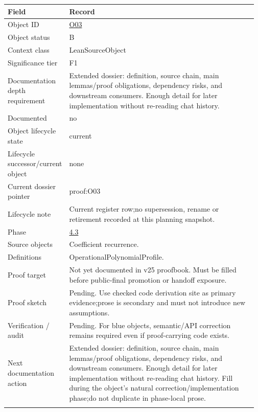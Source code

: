 \begin{longtable}{L{0.16\linewidth} L{0.81\linewidth}}
\hline
\textbf{Field} & \textbf{Record}\\
\hline
Object ID & \hyperlink{object-row-O03}{O03}\\
\hline\addlinespace[0.20em]
Object status & B\\
\hline\addlinespace[0.20em]
Context class & LeanSourceObject\\
\hline\addlinespace[0.20em]
Significance tier & F1\\
\hline\addlinespace[0.20em]
Documentation depth requirement & Extended dossier: definition, source chain, main lemmas/\allowbreak{}proof obligations, dependency risks, and downstream consumers. Enough detail for later implementation without re-reading chat history.\\
\hline\addlinespace[0.20em]
Documented & no\\
\hline\addlinespace[0.20em]
Object lifecycle state & current\\
\hline\addlinespace[0.20em]
Lifecycle successor/\allowbreak{}current object & none\\
\hline\addlinespace[0.20em]
Current dossier pointer & proof:O03\\
\hline\addlinespace[0.20em]
Lifecycle note & Current register row;\newline no supersession, rename or retirement recorded at this planning snapshot.\\
\hline\addlinespace[0.20em]
Phase & \hyperlink{phase-row-4-3}{4.3}\\
\hline\addlinespace[0.20em]
Source objects & Coefficient recurrence.\\
\hline\addlinespace[0.20em]
Definitions & OperationalPolynomialProfile.\\
\hline\addlinespace[0.20em]
Proof target & Not yet documented in v25 proofbook. Must be filled before public-final promotion or handoff exposure.\\
\hline\addlinespace[0.20em]
Proof sketch & Pending. Use checked code derivation site as primary evidence;\newline prose is secondary and must not introduce new assumptions.\\
\hline\addlinespace[0.20em]
Verification /\allowbreak{} audit & Pending. For blue objects, semantic/\allowbreak{}API correction remains required even if proof-carrying code exists.\\
\hline\addlinespace[0.20em]
Next documentation action & Extended dossier: definition, source chain, main lemmas/\allowbreak{}proof obligations, dependency risks, and downstream consumers. Enough detail for later implementation without re-reading chat history. Fill during the object's natural correction/\allowbreak{}implementation phase;\newline do not duplicate in phase-local prose.\\
\hline\addlinespace[0.20em]
\end{longtable}
